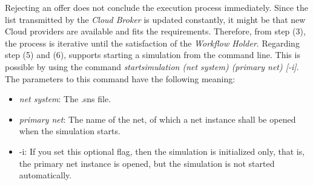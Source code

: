 Rejecting an offer does not conclude the execution process immediately. 
%
Since the list transmitted by the \textit{Cloud Broker} is updated constantly,
%
it might be that new Cloud providers are available and fits the requirements.
%
Therefore, from step (3), the process is iterative until the satisfaction of the \textit{Workflow Holder}.
%
Regarding step (5) and (6), \Renew{} supports starting a simulation from the command line.
%
This is possible by using the command \textit{startsimulation (net system) (primary net) [-i]}.
%
The parameters to this command have the following meaning:
%
\begin{itemize}
 \item 
 \textit{net system}: The .sns file.
\item 
 \textit{primary net}: The name of the net, of which a net instance shall be opened when the simulation starts. 
\item
-i: If you set this optional flag, then the simulation is initialized only, that is, the primary
net instance is opened, but the simulation is not started automatically.
\end{itemize}

%
